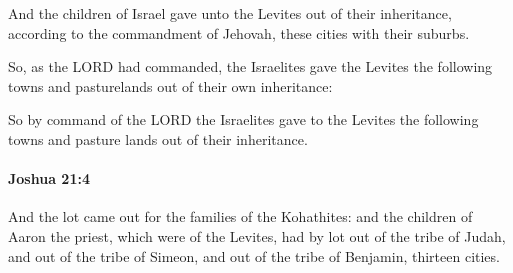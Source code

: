 			\begin{versebox}
					\item[BHS] 
					\item[ASV] And the children of Israel gave unto the Levites out of their inheritance, according to the commandment of Jehovah, these cities with their suburbs.
					\item[NIV] So, as the LORD had commanded, the Israelites gave the Levites the following towns and pasturelands out of their own inheritance:
					\item[NRSV] So by command of the LORD the Israelites gave to the Levites the following towns and pasture lands out of their inheritance.
			\end{versebox}

		\paragraph{Joshua 21:4} %
			\label{JOSHUA-21-4}

			And the lot came out for the families of the Kohathites: and the children of Aaron the priest, which were of the Levites, had by lot out of the tribe of Judah, and out of the tribe of Simeon, and out of the tribe of Benjamin, thirteen cities.

